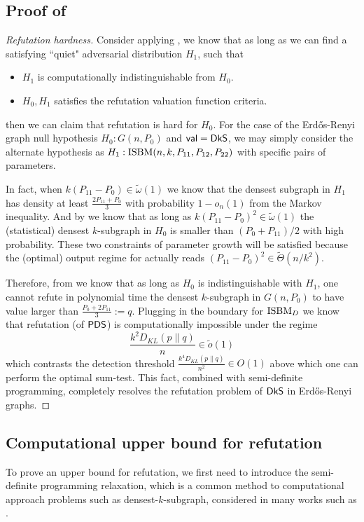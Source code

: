 \documentclass[final,12pt]{colt2023} %
\newcommand\1[1]{\mathbb{I}_{\left\{#1\right\}}}
\begin{document}
\subsection{Proof of }
\begin{proof}[Refutation hardness]
Consider applying , we know that as long as we can find a satisfying ``quiet" adversarial distribution $H_1$, such that\begin{itemize}
    \item $H_1$ is computationally indistinguishable from $H_0$.
    \item $H_0, H_1$ satisfies the refutation valuation function criteria.
\end{itemize}
then we can claim that refutation is hard for $H_0$. For the case of the Erd\H{o}s-Renyi graph null hypothesis $H_0: G(n, P_0)$ and $\mathsf{val}=\mathsf{DkS}$, we may simply consider the alternate hypothesis as $H_1: \textup{ISBM}(n, k, P_{11}, P_{12}, P_{22})$ with specific pairs of parameters.

\spac
In fact, when $k(P_{11}-P_0)\in\tilde\omega(1)$ we know that the densest subgraph in $H_1$ has density at least $\frac{2P_{11}+P_0}{3}$ with probability $1-o_n(1)$ from the Markov inequality. And by  we know that as long as $k(P_{11}-P_0)^2\in\tilde\omega(1)$ the (statistical) densest $k$-subgraph in $H_0$ is smaller than $(P_0+P_{11})/2$ with high probability. These two constraints of parameter growth will be satisfied because the (optimal) output regime for  actually reads $(P_{11}-P_0)^2\in\tilde \Theta(n/k^2)$.

\spac Therefore, from  we know that as long as $H_0$ is indistinguishable with $H_1$, one cannot refute in polynomial time the densest $k$-subgraph in $G(n, P_0)$ to have value larger than $\frac{P_0+2P_{11}}{3}:=q$. Plugging in the boundary for $\textup{ISBM}_D$ we know that refutation (of $\mathsf{PDS}$) is computationally impossible under the regime $$\frac{k^2D_{KL}(p\|q)}{n}\in\tilde o(1)$$ which contrasts the detection threshold $\frac{k^4D_{KL}(p\|q)}{n^2}\in O(1)$ above which one can perform the optimal sum-test. This fact, combined with semi-definite programming, completely resolves the refutation problem of $\mathsf{DkS}$ in Erd\H{o}s-Renyi graphs.
\end{proof}

\subsection{Computational upper bound for refutation}
To prove an upper bound for refutation, we first need to introduce the semi-definite programming relaxation, which is a common method to computational approach problems such as densest-$k$-subgraph, considered in many works such as \cite{HWX16, CX14}.
\end{document}

